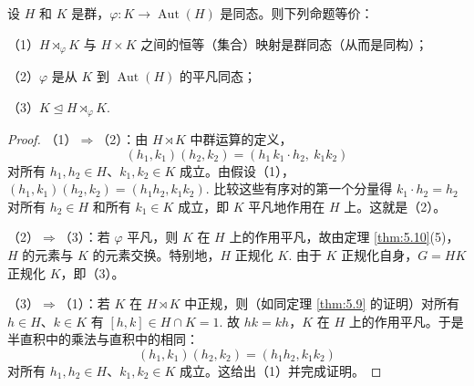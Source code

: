 \begin{proposition}\label{pro:5.11}
设 \(H\) 和 \(K\) 是群，\(\varphi : K \to \operatorname{Aut}(H)\) 是同态。则下列命题等价：

（1）\(H \rtimes_\varphi K\) 与 \(H \times K\) 之间的恒等（集合）映射是群同态（从而是同构）；

（2）\(\varphi\) 是从 \(K\) 到 \(\operatorname{Aut}(H)\) 的平凡同态；

（3）\(K \trianglelefteq H \rtimes_\varphi K\).
\end{proposition}

\begin{proof}
（1）\(\Rightarrow\)（2）：由 \(H \rtimes K\) 中群运算的定义，
\[
(h_1, k_1)(h_2, k_2) = (h_1\, k_1 \cdot h_2,\ k_1k_2)
\]
对所有 \(h_1, h_2 \in H\)、\(k_1, k_2 \in K\) 成立。由假设（1），\((h_1, k_1)(h_2, k_2) = (h_1h_2, k_1k_2)\). 比较这些有序对的第一个分量得 \(k_1 \cdot h_2 = h_2\) 对所有 \(h_2 \in H\) 和所有 \(k_1 \in K\) 成立，即 \(K\) 平凡地作用在 \(H\) 上。这就是（2）。

（2）\(\Rightarrow\)（3）：若 \(\varphi\) 平凡，则 \(K\) 在 \(H\) 上的作用平凡，故由定理 \ref{thm:5.10}(5)，\(H\) 的元素与 \(K\) 的元素交换。特别地，\(H\) 正规化 \(K\). 由于 \(K\) 正规化自身，\(G = HK\) 正规化 \(K\)，即（3）。

（3）\(\Rightarrow\)（1）：若 \(K\) 在 \(H \rtimes K\) 中正规，则（如同定理 \ref{thm:5.9} 的证明）对所有 \(h \in H\)、\(k \in K\) 有 \([h, k] \in H \cap K = 1\). 故 \(hk = kh\)，\(K\) 在 \(H\) 上的作用平凡。于是半直积中的乘法与直积中的相同：
\[
(h_1, k_1)(h_2, k_2) = (h_1h_2, k_1k_2)
\]
对所有 \(h_1, h_2 \in H\)、\(k_1, k_2 \in K\) 成立。这给出（1）并完成证明。
\end{proof}

